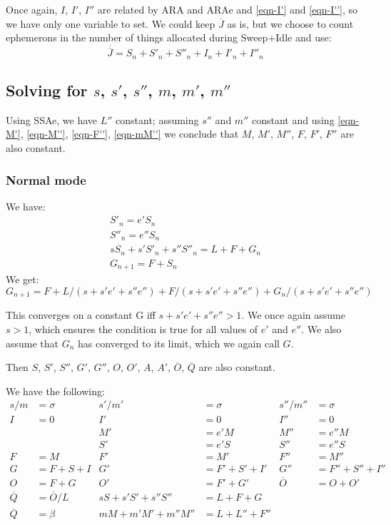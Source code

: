 \documentclass{article}
\begin{document}
Once again, $I$, $I'$, $I''$ are related by ARA and ARAe and
\eqref{eqn-I'} and \eqref{eqn-I''}, so we have only one variable to
set. We could keep $\overline{J}$ as is, but we choose to count
ephemerons in the number of things allocated
during Sweep+Idle and use:
\begin{equation}
\overline{\overline{J}} = S_n + S'_n + S''_n + I_n + I'_n + I''_n
\end{equation}


\subsection[Solving for s, s', s'', m, m', m'']
{Solving for $s$, $s'$, $s''$, $m$, $m'$, $m''$}

Using SSAe, we have $L''$ constant; assuming $s''$ and $m''$ constant
and using \eqref{eqn-M'}, \eqref{eqn-M''}, \eqref{eqn-F''},
\eqref{eqn-mM''} we conclude that $M$, $M'$, $M''$, $F$, $F'$, $F''$
are also constant.


\subsubsection{Normal mode}

We have:
\begin{gather*}
S'_n = e'S_n \\
S''_n = e''S_n \\
sS_n + s'S'_n + s''S''_n = L + F + G_n \\
G_{n+1} = F + S_n
\end{gather*}
We get:
\begin{equation}
G_{n+1} = F + L/(s+s'e'+s''e'') + F/(s+s'e'+s''e'') + G_n/(s+s'e'+s''e'')
\end{equation}

This converges on a constant G iff $s+s'e'+s''e'' > 1$. We once again
assume $s > 1$, which ensures the condition is true for all values of
$e'$ and $e''$. We also assume that $G_n$ has converged to its limit,
which we again call $G$.

Then $S$, $S'$, $S''$, $G'$, $G''$, $O$, $O'$, $A$, $A'$,
$\overline{O}$, $\overline{Q}$ are also constant.

We have the following:
\begin{align*}
s/m &= \sigma  &  s'/m' &= \sigma  &  s''/m'' &= \sigma  \\
I &= 0  &  I' &= 0  &  I'' &= 0  \\
 & & M' &= e'M  &  M'' &= e''M \\
 & & S' &= e'S  &  S'' &= e''S \\
F &= M & F' &= M' &  F'' &= M'' \\
G &= F + S + I  &  G' &= F' + S' + I'  &  G'' &= F'' + S'' + I'' \\
O &= F + G  &  O' &= F' + G' & \overline{O} &= O + O' \\
\overline{Q} &= \overline{O}/L  & sS + s'S' + s''S'' &= L + F + G \\
\overline{Q} &= \beta  & mM + m'M' + m''M'' &= L + L'' + F''
\end{align*}
\end{document}
